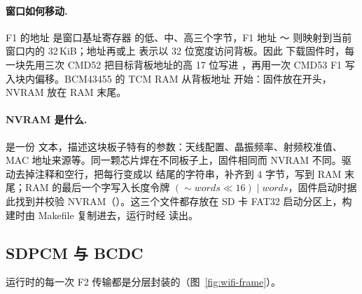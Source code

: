 \paragraph{窗口如何移动.} F1 的地址  是窗口基址寄存器  的低、中、高三个字节，F1 地址 ～ 则映射到当前窗口内的 32\,KiB；地址再或上  表示以 32 位宽度访问背板。因此  下载固件时，每一块先用三次 CMD52 把目标背板地址的高 17 位写进 ，再用一次 CMD53 F1 写入块内偏移。BCM43455 的 TCM RAM 从背板地址  开始：固件放在开头，NVRAM 放在 RAM 末尾。

\paragraph{NVRAM 是什么.}  是一份  文本，描述这块板子特有的参数：天线配置、晶振频率、射频校准值、MAC 地址来源等。同一颗芯片焊在不同板子上，固件相同而 NVRAM 不同。驱动去掉注释和空行，把每行变成以  结尾的字符串，补齐到 4 字节，写到 RAM 末尾；RAM 的最后一个字写入长度令牌 $(\sim words\ll16)\mid words$，固件启动时据此找到并校验 NVRAM（）。这三个文件都存放在 SD 卡 FAT32 启动分区上，构建时由 Makefile 复制进去，运行时经  读出。

\subsection{SDPCM 与 BCDC}

运行时的每一次 F2 传输都是分层封装的（图~\ref{fig:wifi-frame}）。

